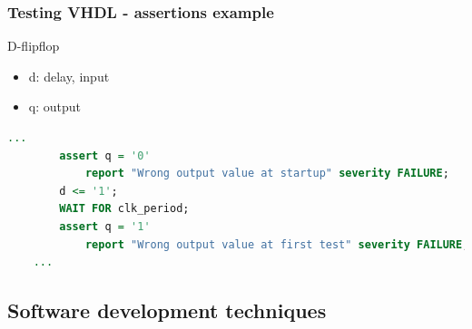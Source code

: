 \documentclass[british,10pt]{beamer}
\begin{document}
\begin{frame}[fragile]\frametitle{Testing VHDL - assertions example }
D-flipflop
\begin{itemize}
\item d: delay, input
\item q: output
\end{itemize}
\centering
\begin{lstlisting}[language=VHDL, tabsize=4, frame=single, framesep=2mm, belowskip=8pt, aboveskip=8pt, showstringspaces=false, basicstyle=\scriptsize]
	...
		assert q = '0'
			report "Wrong output value at startup" severity FAILURE;
		d <= '1';
     	WAIT FOR clk_period;
     	assert q = '1'
			report "Wrong output value at first test" severity FAILURE;
	...
\end{lstlisting}
\end{frame}

\subsection{Software development techniques}

\end{document}
